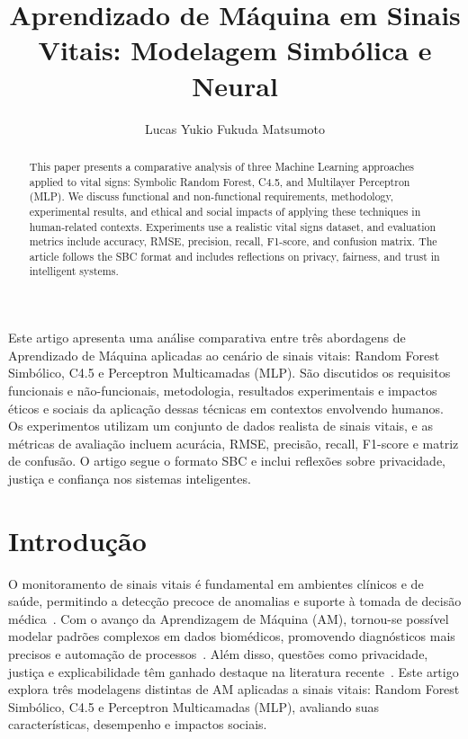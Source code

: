 \documentclass[11pt]{article}
\title{Aprendizado de Máquina em Sinais Vitais: Modelagem Simbólica e Neural}
\author{Lucas Yukio Fukuda Matsumoto\inst{1}}
\begin{document}
\fontsize{11pt}{11pt}\selectfont
\maketitle

\begin{resumo}
Este artigo apresenta uma análise comparativa entre três abordagens de Aprendizado de Máquina aplicadas ao cenário de sinais vitais: Random Forest Simbólico, C4.5 e Perceptron Multicamadas (MLP). São discutidos os requisitos funcionais e não-funcionais, metodologia, resultados experimentais e impactos éticos e sociais da aplicação dessas técnicas em contextos envolvendo humanos. Os experimentos utilizam um conjunto de dados realista de sinais vitais, e as métricas de avaliação incluem acurácia, RMSE, precisão, recall, F1-score e matriz de confusão. O artigo segue o formato SBC e inclui reflexões sobre privacidade, justiça e confiança nos sistemas inteligentes.
\end{resumo}

\begin{abstract}
This paper presents a comparative analysis of three Machine Learning approaches applied to vital signs: Symbolic Random Forest, C4.5, and Multilayer Perceptron (MLP). We discuss functional and non-functional requirements, methodology, experimental results, and ethical and social impacts of applying these techniques in human-related contexts. Experiments use a realistic vital signs dataset, and evaluation metrics include accuracy, RMSE, precision, recall, F1-score, and confusion matrix. The article follows the SBC format and includes reflections on privacy, fairness, and trust in intelligent systems.
\end{abstract}

\section{Introdução}
O monitoramento de sinais vitais é fundamental em ambientes clínicos e de saúde, permitindo a detecção precoce de anomalias e suporte à tomada de decisão médica~\cite{clifford2012advanced}. Com o avanço da Aprendizagem de Máquina (AM), tornou-se possível modelar padrões complexos em dados biomédicos, promovendo diagnósticos mais precisos e automação de processos~\cite{shickel2017deep}. Além disso, questões como privacidade, justiça e explicabilidade têm ganhado destaque na literatura recente~\cite{mehrabi2021survey,voigt2017gdpr}. Este artigo explora três modelagens distintas de AM aplicadas a sinais vitais: Random Forest Simbólico, C4.5 e Perceptron Multicamadas (MLP), avaliando suas características, desempenho e impactos sociais.
\end{document}
